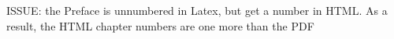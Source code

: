 ISSUE: the Preface is unnumbered in Latex, but get a number in HTML. As a result, the HTML chapter numbers are one more than the PDF